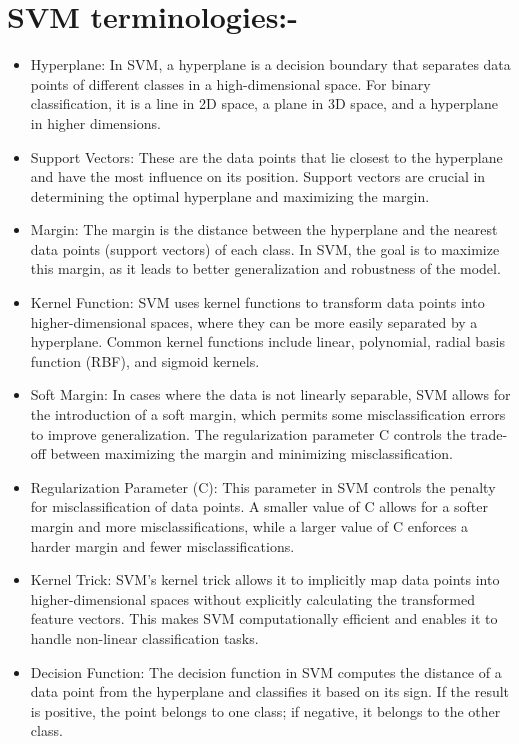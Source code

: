 \documentclass[12pt,a4paper]{report}
\begin{document}
\section*{SVM terminologies:-}
\begin{itemize}
\item Hyperplane: In SVM, a hyperplane is a decision boundary that separates data points of different classes in a high-dimensional space. For binary classification, it is a line in 2D space, a plane in 3D space, and a hyperplane in higher dimensions.
\item Support Vectors: These are the data points that lie closest to the hyperplane and have the most influence on its position. Support vectors are crucial in determining the optimal hyperplane and maximizing the margin.
\item Margin: The margin is the distance between the hyperplane and the nearest data points (support vectors) of each class. In SVM, the goal is to maximize this margin, as it leads to better generalization and robustness of the model.
\item Kernel Function: SVM uses kernel functions to transform data points into higher-dimensional spaces, where they can be more easily separated by a hyperplane. Common kernel functions include linear, polynomial, radial basis function (RBF), and sigmoid kernels.
\item Soft Margin: In cases where the data is not linearly separable, SVM allows for the introduction of a soft margin, which permits some misclassification errors to improve generalization. The regularization parameter C controls the trade-off between maximizing the margin and minimizing misclassification.
\item Regularization Parameter (C): This parameter in SVM controls the penalty for misclassification of data points. A smaller value of C allows for a softer margin and more misclassifications, while a larger value of C enforces a harder margin and fewer misclassifications.
\item Kernel Trick: SVM's kernel trick allows it to implicitly map data points into higher-dimensional spaces without explicitly calculating the transformed feature vectors. This makes SVM computationally efficient and enables it to handle non-linear classification tasks.
\item Decision Function: The decision function in SVM computes the distance of a data point from the hyperplane and classifies it based on its sign. If the result is positive, the point belongs to one class; if negative, it belongs to the other class.
\end{itemize}
\end{document}
